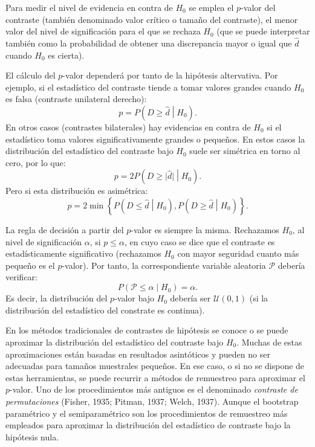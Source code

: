 \documentclass[
]{book}
\theoremstyle{break}
\theoremstyle{nonumberplain}
\begin{document}
Para medir el nivel de evidencia en contra de \(H_0\) se emplea el
\(p\)-valor del contraste (también denominado valor crítico o
tamaño del contraste), el menor valor del nivel
de significación para el que se rechaza \(H_0\)
(que se puede interpretar también como la
probabilidad de obtener una discrepancia mayor o igual que
\(\hat{d}\) cuando \(H_0\) es cierta).

El cálculo del \(p\)-valor dependerá por tanto de la hipótesis altervativa.
Por ejemplo, si el estadístico del contraste tiende a tomar valores
grandes cuando \(H_0\) es falsa (contraste unilateral derecho):
\[p = P\left( D \geq \hat{d} \middle| H_0\right).\]
En otros casos (contrastes bilaterales) hay evidencias en contra de
\(H_0\) si el estadístico toma valores significativamente grandes o pequeños.
En estos casos la distribución del estadístico del contraste bajo \(H_0\)
suele ser simétrica en torno al cero, por lo que:
\[p = 2P\left( D \geq \vert \hat{d} \vert \middle| H_0 \right).\]
Pero si esta distribución es asimétrica:
\[p = 2 \min \left\{ P\left( D \leq \hat{d} \middle| H_0 \right),
P\left( D \geq \hat{d} \middle| H_0\right) \right\}.\]

La regla de decisión a partir del \(p\)-valor es siempre la misma.
Rechazamos \(H_0\), al nivel de significación \(\alpha\), si \(p \leq \alpha\),
en cuyo caso se dice que el contraste es estadísticamente significativo
(rechazamos \(H_0\) con mayor seguridad cuanto más pequeño es el \(p\)-valor).
Por tanto, la correspondiente variable aleatoria \(\mathcal{P}\) debería verificar:
\[P\left( \mathcal{P} \leq \alpha \middle| H_0\right)= \alpha.\]
Es decir, la distribución del \(p\)-valor bajo \(H_0\) debería ser \(\mathcal{U}(0,1)\)
(si la distribución del estadístico del constrate es continua).

En los métodos tradicionales de contrastes de hipótesis se conoce o se
puede aproximar la distribución del estadístico del contraste bajo \(H_0\).
Muchas de estas aproximaciones están basadas en resultados asintóticos
y pueden no ser adecuadas para tamaños muestrales pequeños.
En ese caso, o si no se dispone de estas herramientas,
se puede recurrir a métodos de remuestreo para aproximar el \(p\)-valor.
Uno de los procedimientos más antiguos es el denominado
\emph{contraste de permutaciones} (Fisher, 1935; Pitman, 1937; Welch, 1937).
Aunque el bootstrap paramétrico y el semiparamétrico son los
procedimientos de remuestreo más empleados para aproximar
la distribución del estadístico de contraste bajo la hipótesis nula.
\end{document}
